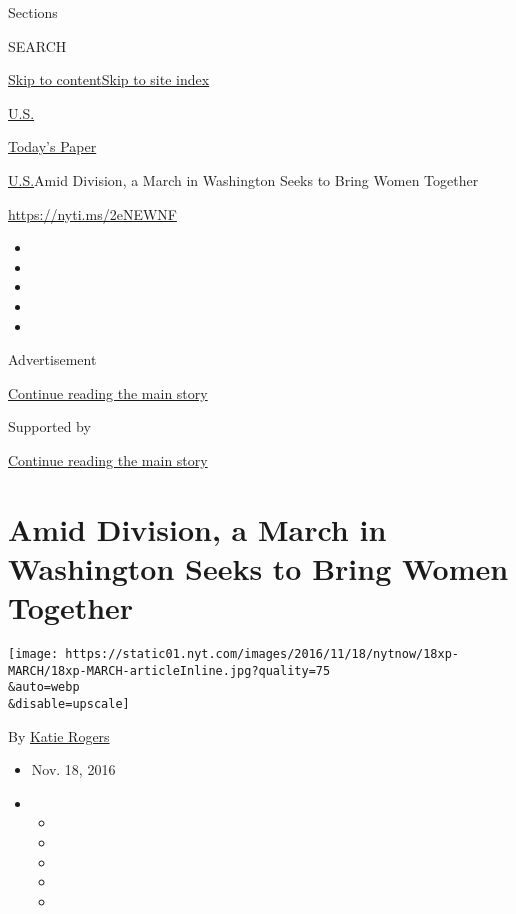 Sections

SEARCH

\protect\hyperlink{site-content}{Skip to
content}\protect\hyperlink{site-index}{Skip to site index}

\href{https://www.nytimes.com/section/us}{U.S.}

\href{https://myaccount.nytimes.com/auth/login?response_type=cookie\&client_id=vi}{}

\href{https://www.nytimes.com/section/todayspaper}{Today's Paper}

\href{/section/us}{U.S.}\textbar{}Amid Division, a March in Washington
Seeks to Bring Women Together

\url{https://nyti.ms/2eNEWNF}

\begin{itemize}
\item
\item
\item
\item
\item
\end{itemize}

Advertisement

\protect\hyperlink{after-top}{Continue reading the main story}

Supported by

\protect\hyperlink{after-sponsor}{Continue reading the main story}

\hypertarget{amid-division-a-march-in-washington-seeks-to-bring-women-together}{%
\section{Amid Division, a March in Washington Seeks to Bring Women
Together}\label{amid-division-a-march-in-washington-seeks-to-bring-women-together}}

\texttt{[image: https://static01.nyt.com/images/2016/11/18/nytnow/18xp-MARCH/18xp-MARCH-articleInline.jpg?quality=75\\\&auto=webp\\\&disable=upscale]}

By \href{http://www.nytimes.com/by/katie-rogers}{Katie Rogers}

\begin{itemize}
\item
  Nov. 18, 2016
\item
  \begin{itemize}
  \item
  \item
  \item
  \item
  \item
  \end{itemize}
\end{itemize}


